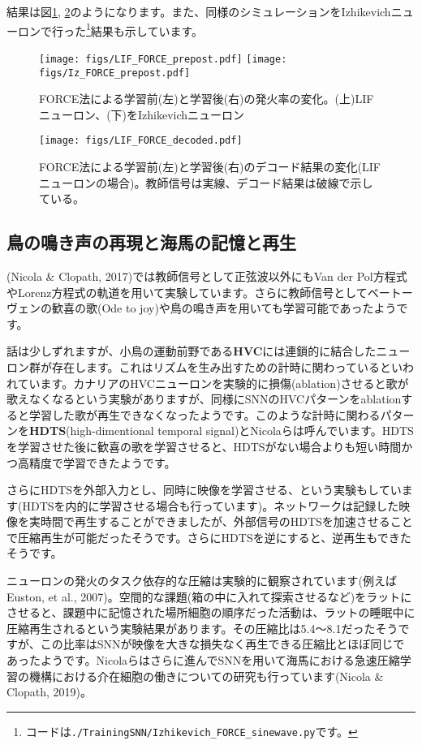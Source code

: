 結果は図\ref{fig:LIF_FORCE_1}, \ref{fig:LIF_FORCE_2}のようになります。また、同様のシミュレーションをIzhikevichニューロンで行った\footnote{コードは\texttt{./TrainingSNN/Izhikevich\_FORCE\_sinewave.py}です。}結果も示しています。
\begin{figure}[htbp]
    \centering
    \texttt{[image: figs/LIF\_FORCE\_prepost.pdf]}
    \texttt{[image: figs/Iz\_FORCE\_prepost.pdf]}
    \caption{FORCE法による学習前(左)と学習後(右)の発火率の変化。(上)LIFニューロン、(下)をIzhikevichニューロン}
    \label{fig:LIF_FORCE_1}
\end{figure}
\begin{figure}[H]
    \centering
    \texttt{[image: figs/LIF\_FORCE\_decoded.pdf]}
    \caption{FORCE法による学習前(左)と学習後(右)のデコード結果の変化(LIFニューロンの場合)。教師信号は実線、デコード結果は破線で示している。}
    \label{fig:LIF_FORCE_2}
\end{figure}
\subsection{鳥の鳴き声の再現と海馬の記憶と再生}
(Nicola \& Clopath, 2017)では教師信号として正弦波以外にもVan der Pol方程式やLorenz方程式の軌道を用いて実験しています。さらに教師信号としてベートーヴェンの歓喜の歌(Ode to joy)や鳥の鳴き声を用いても学習可能であったようです。\par
話は少しずれますが、小鳥の運動前野である\textbf{HVC}には連鎖的に結合したニューロン群が存在します。これはリズムを生み出すための計時に関わっているといわれています。カナリアのHVCニューロンを実験的に損傷(ablation)させると歌が歌えなくなるという実験がありますが、同様にSNNのHVCパターンをablationすると学習した歌が再生できなくなったようです。このような計時に関わるパターンを\textbf{HDTS}(high-dimentional temporal signal)とNicolaらは呼んでいます。HDTSを学習させた後に歓喜の歌を学習させると、HDTSがない場合よりも短い時間かつ高精度で学習できたようです。\par
さらにHDTSを外部入力とし、同時に映像を学習させる、という実験もしています(HDTSを内的に学習させる場合も行っています)。ネットワークは記録した映像を実時間で再生することができましたが、外部信号のHDTSを加速させることで圧縮再生が可能だったそうです。さらにHDTSを逆にすると、逆再生もできたそうです。\par
ニューロンの発火のタスク依存的な圧縮は実験的に観察されています(例えばEuston, et al., 2007)。空間的な課題(箱の中に入れて探索させるなど)をラットにさせると、課題中に記憶された場所細胞の順序だった活動は、ラットの睡眠中に圧縮再生されるという実験結果があります。その圧縮比は5.4〜8.1だったそうですが、この比率はSNNが映像を大きな損失なく再生できる圧縮比とほぼ同じであったようです。Nicolaらはさらに進んでSNNを用いて海馬における急速圧縮学習の機構における介在細胞の働きについての研究も行っています(Nicola \& Clopath, 2019)。

